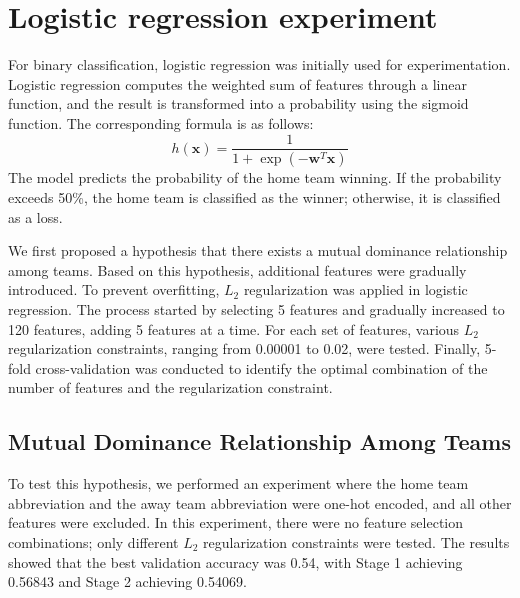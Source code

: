 \documentclass[12pt,a4paper]{article}
\begin{document}
\section{Logistic regression experiment}

For binary classification, logistic regression was initially used for experimentation. Logistic regression computes the weighted sum of features through a linear function, and the result is transformed into a probability using the sigmoid function. The corresponding formula is as follows:
\[
h(\mathbf{x}) = \frac{1}{1 + \exp(-\mathbf{w}^T \mathbf{x})}
\]
The model predicts the probability of the home team winning. If the probability exceeds 50\%, the home team is classified as the winner; otherwise, it is classified as a loss.

We first proposed a hypothesis that there exists a mutual dominance relationship among teams. Based on this hypothesis, additional features were gradually introduced. To prevent overfitting, \( L_2 \) regularization was applied in logistic regression. The process started by selecting 5 features and gradually increased to 120 features, adding 5 features at a time. For each set of features, various \( L_2 \) regularization constraints, ranging from 0.00001 to 0.02, were tested. Finally, 5-fold cross-validation was conducted to identify the optimal combination of the number of features and the regularization constraint.

\subsection{Mutual Dominance Relationship Among Teams}  

To test this hypothesis, we performed an experiment where the home team abbreviation and the away team abbreviation were one-hot encoded, and all other features were excluded. In this experiment, there were no feature selection combinations; only different \(L_2\) regularization constraints were tested. The results showed that the best validation accuracy was 0.54, with Stage 1 achieving 0.56843 and Stage 2 achieving 0.54069.

\end{document}
